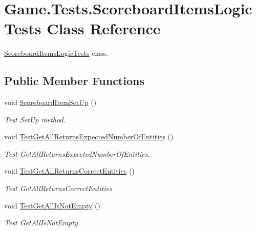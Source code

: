 \hypertarget{class_game_1_1_tests_1_1_scoreboard_items_logic_tests}{}\section{Game.\+Tests.\+Scoreboard\+Items\+Logic\+Tests Class Reference}
\label{class_game_1_1_tests_1_1_scoreboard_items_logic_tests}


\mbox{\hyperlink{class_game_1_1_tests_1_1_scoreboard_items_logic_tests}{Scoreboard\+Items\+Logic\+Tests}} class.  


\subsection*{Public Member Functions}
\begin{DoxyCompactItemize}
\item 
void \mbox{\hyperlink{class_game_1_1_tests_1_1_scoreboard_items_logic_tests_ab9a95cb43d0104d47981bfa849437118}{Scoreboard\+Item\+Set\+Up}} ()
\begin{DoxyCompactList}\small\item\em Test Set\+Up method. \end{DoxyCompactList}\item 
void \mbox{\hyperlink{class_game_1_1_tests_1_1_scoreboard_items_logic_tests_a88619e80152cefc692641f85c43731d8}{Test\+Get\+All\+Returns\+Expected\+Number\+Of\+Entities}} ()
\begin{DoxyCompactList}\small\item\em Test Get\+All\+Returns\+Expected\+Number\+Of\+Entities. \end{DoxyCompactList}\item 
void \mbox{\hyperlink{class_game_1_1_tests_1_1_scoreboard_items_logic_tests_a62f5c48125267ffd290f51f0a7bf9857}{Test\+Get\+All\+Returns\+Correct\+Entities}} ()
\begin{DoxyCompactList}\small\item\em Test Get\+All\+Returns\+Correct\+Entities \end{DoxyCompactList}\item 
void \mbox{\hyperlink{class_game_1_1_tests_1_1_scoreboard_items_logic_tests_aca42cee8e9112c9dc57951d9c768371d}{Test\+Get\+All\+Is\+Not\+Empty}} ()
\begin{DoxyCompactList}\small\item\em Test Get\+All\+Is\+Not\+Empty. \end{DoxyCompactList}\item 

\end{DoxyCompactItemize}
